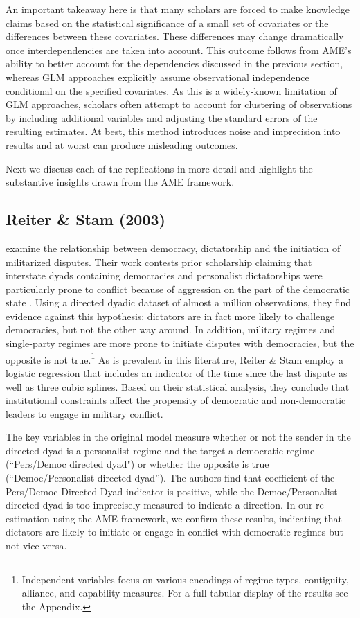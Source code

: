 \documentclass[12pt]{amsart}
\begin{document}
An important takeaway here is that many scholars are forced to make knowledge claims based on the statistical significance of a small set of covariates or the differences between these covariates. These differences may change dramatically once interdependencies are taken into account. This outcome follows from AME's ability to better account for the dependencies discussed in the previous section, whereas GLM approaches explicitly assume observational independence conditional on the specified covariates. As this is a widely-known limitation of GLM approaches, scholars often attempt to account for clustering of observations by including additional variables and adjusting the standard errors of the resulting estimates. At best, this method introduces noise and imprecision into results and at worst can produce misleading outcomes.

Next we discuss each of the replications in more detail and highlight the substantive insights drawn from the AME framework.

\subsection{Reiter \& Stam (2003)}

\citet{reiter:stam:2003} examine the relationship between democracy, dictatorship and the initiation of militarized disputes. Their work contests prior scholarship claiming that interstate dyads containing democracies and personalist dictatorships were particularly prone to conflict because of aggression on the part of the democratic state \citep{peceny:etal:2002}. Using a directed dyadic dataset of almost a million observations, they find evidence against this hypothesis: dictators are in fact more likely to challenge democracies, but not the other way around. In addition, military regimes and single-party regimes are more prone to initiate disputes with democracies, but the opposite is not true.\footnote{Independent variables focus on various encodings of regime types, contiguity, alliance, and capability measures. For a full tabular display of the results see the Appendix.} As is prevalent in this literature, Reiter \& Stam employ a logistic regression that includes an indicator of the time since the last dispute as well as three cubic splines. Based on their statistical analysis, they conclude that institutional constraints affect the propensity of democratic and non-democratic leaders to engage in military conflict.

The key variables in the original model measure whether or not the sender in the directed dyad is a personalist regime and the target a democratic regime (``Pers/Democ directed dyad") or whether the opposite is true (``Democ/Personalist directed dyad''). The authors find that coefficient of the Pers/Democ Directed Dyad indicator is positive, while the Democ/Personalist directed dyad is too imprecisely measured to indicate a direction. In our re-estimation using the AME framework, we confirm these results, indicating that dictators are likely to initiate or engage in conflict with democratic regimes but not vice versa.
\end{document}
